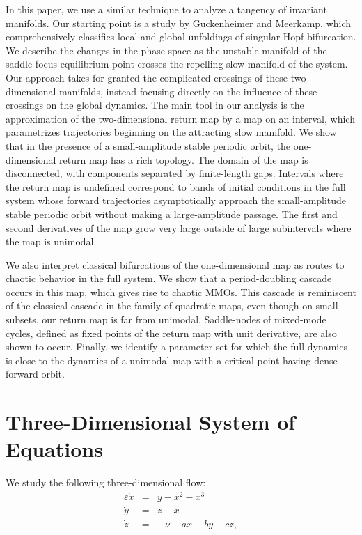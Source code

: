 \documentclass[aip, cha, sd, amsmath,amssymb, preprint]{revtex4-1}
\begin{document}
In this paper, we use a similar technique to analyze a tangency of invariant manifolds.  Our starting point is a study by Guckenheimer and Meerkamp\cite{guckenheimer2012siam}, which comprehensively classifies local and global unfoldings of singular Hopf bifurcation. We describe the changes in the phase space as the unstable manifold of the saddle-focus equilibrium point crosses the repelling slow manifold of the system. Our approach takes for granted the complicated crossings of these two-dimensional manifolds, instead focusing directly on the influence of these crossings on the global dynamics. The main tool in our analysis is the approximation of the two-dimensional return map by a map on an interval, which parametrizes trajectories beginning on the attracting slow manifold. We show that in the presence of a small-amplitude stable periodic orbit, the one-dimensional return map has a rich topology. The domain of the map is disconnected, with components separated by finite-length gaps. Intervals where the return map is undefined correspond to bands of initial conditions in the full system whose forward trajectories asymptotically approach the small-amplitude stable periodic orbit without making a large-amplitude passage. The first and second derivatives of the map grow very large outside of large subintervals where the map is unimodal. 

We also interpret classical bifurcations of the one-dimensional map as routes to chaotic behavior in the full system. We show that a period-doubling cascade occurs in this map, which gives rise to chaotic MMOs. This cascade is reminiscent of the classical cascade in the family of quadratic maps, even though on small subsets, our return map is far from unimodal. Saddle-nodes of mixed-mode cycles, defined as fixed points of the return map with unit derivative, are also shown to occur. Finally, we identify a parameter set for which the full dynamics is close to the dynamics of a unimodal map with a critical point having dense forward orbit.

\section{\label{sec:shnf} Three-Dimensional System of Equations}

We study the following three-dimensional flow:
\begin{eqnarray}
{ \varepsilon} \dot{x} &=& y - x^2 - x^3 \nonumber\\
\dot{y} &=& z - x \label{eq:shnf}\\
\dot{z} &=& -\nu - ax -by - cz,\nonumber
\end{eqnarray}
\end{document}
